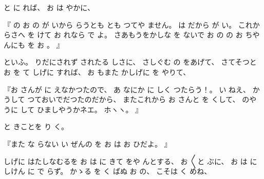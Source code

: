%
と
に
れば、
%
お
は
やかに、

%
『
の
お
の
が
いから
らうとも
とも
つてや
ません。
%
は
だから
が
い。
%
これからさへ
を
けて
お
れなら
で
よ。
%
さあもうをかしな
を
ないで
お
の
の
お
ちやんにも
を
お
。
』

%
といふ。
%
りだにされず
されたる
しさに、
%
さしぐむ
の
をあげて、
%
さてそつと
お
を
て
しげに
すれば、
%
お
もまた
かしげに
を
やりて、

%
『お
さんが
に
えなかつたので、
%
あ
なにか
に
しく
つたらう！。
%
い
ねえ、
%
かうして
つておいでだつたのだから、
%
またこれから
お
さんと
を
くして、
%
のやうに
して
ひましやうかネエ。
%
ホヽヽ。
』

%
と
きことを
り
く。

%
『また
な
らない
い
ぜんの
を
お
は
お
ひだよ。
』

%
しげに
はたしなむるを
お
は
に
きて
をや
んとする、
%
お
〳〵と
ぶに、
%
お
は
にしけん
に
で
らず。
%
かゝる
を
く
ばぬ
お
の、
%
こそは
く
めね、

